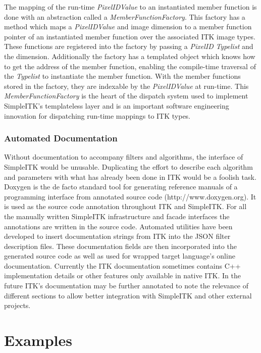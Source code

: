 \documentclass{frontiersMED} %
\begin{document}
The mapping of the run-time \textit{PixelIDValue} to an instantiated member
function is done with an abstraction called a
\textit{MemberFunctionFactory}. This factory has a method which maps a
\textit{PixelIDValue} and image dimension to a member function pointer of an
instantiated member function over the associated ITK image
types. These functions are registered into the factory by passing a
\textit{PixelID} \textit{Typelist} and the dimension. Additionally the factory has a
templated object which knows how to get the address of  the member
function, enabling the compile-time traversal of the \textit{Typelist} to
instantiate the member function.  With the member functions stored in
the factory, they are indexable by the \textit{PixelIDValue} at run-time. This
\textit{MemberFunctionFactory} is the heart of the dispatch system used to
implement SimpleITK's templateless layer and is an important software
engineering innovation for dispatching run-time mappings to ITK types.

\subsubsection{Automated Documentation}
Without documentation to accompany filters and algorithms, the
interface of SimpleITK would be unusable. Duplicating the effort to
describe each algorithm and parameters with what has already been done
in ITK would be a foolish task. Doxygen is the de facto standard tool
for generating reference manuals of a programming interface from
annotated source code (http://www.doxygen.org). It is used as the source code annotation
throughout ITK and SimpleITK. For all the manually written SimpleITK
infrastructure and facade interfaces the annotations are written in
the source code. Automated utilities have been developed to insert
documentation strings from ITK into the JSON filter description files. These
documentation fields are then incorporated into the generated source
code as well as used for wrapped target language's online
documentation. Currently the ITK documentation sometimes contains C++
implementation details or other features only available in native ITK.
In the future ITK's documentation may be further annotated to
note the relevance of different sections to allow better
integration with SimpleITK and other external projects.



\section{Examples}
\end{document}
